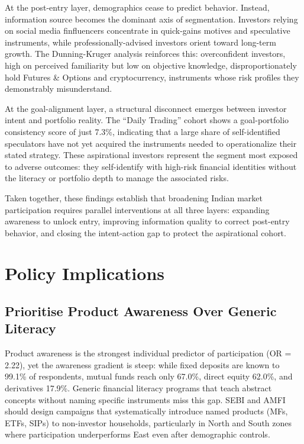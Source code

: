 \documentclass[conference]{IEEEtran}
\begin{document}
At the post-entry layer, demographics cease to predict behavior. Instead, information source becomes the dominant axis of segmentation. Investors relying on social media finfluencers concentrate in quick-gains motives and speculative instruments, while professionally-advised investors orient toward long-term growth. The Dunning-Kruger analysis reinforces this: overconfident investors, high on perceived familiarity but low on objective knowledge, disproportionately hold Futures \& Options and cryptocurrency, instruments whose risk profiles they demonstrably misunderstand.

At the goal-alignment layer, a structural disconnect emerges between investor intent and portfolio reality. The ``Daily Trading'' cohort shows a goal-portfolio consistency score of just 7.3\%, indicating that a large share of self-identified speculators have not yet acquired the instruments needed to operationalize their stated strategy. These aspirational investors represent the segment most exposed to adverse outcomes: they self-identify with high-risk financial identities without the literacy or portfolio depth to manage the associated risks.

Taken together, these findings establish that broadening Indian market participation requires parallel interventions at all three layers: expanding awareness to unlock entry, improving information quality to correct post-entry behavior, and closing the intent-action gap to protect the aspirational cohort.

\section{Policy Implications}

\subsection{Prioritise Product Awareness Over Generic Literacy}
Product awareness is the strongest individual predictor of participation (OR = 2.22), yet the awareness gradient is steep: while fixed deposits are known to 99.1\% of respondents, mutual funds reach only 67.0\%, direct equity 62.0\%, and derivatives 17.9\%. Generic financial literacy programs that teach abstract concepts without naming specific instruments miss this gap. SEBI and AMFI should design campaigns that systematically introduce named products (MFs, ETFs, SIPs) to non-investor households, particularly in North and South zones where participation underperforms East even after demographic controls.
\end{document}

